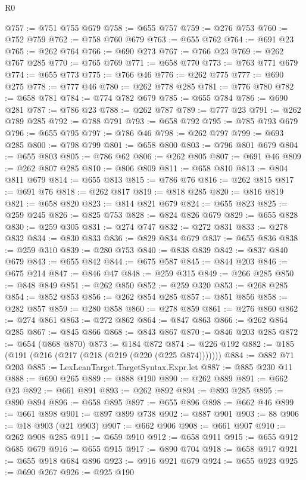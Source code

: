 \begin{lexlean}{R0}
\begin{coremodule}
@757 := @751 @755 @679
@758 := @655 @757
@759 := @276 @753
@760 := @752 @759
@762 := @758 @760 @679
@763 := @655 @762
@764 := @691 @23
@765 := @262 @764
@766 := @690 @273
@767 := @766 @23
@769 := @262 @767 @285
@770 := @765 @769
@771 := @658 @770
@773 := @763 @771 @679
@774 := @655 @773
@775 := @766 @46
@776 := @262 @775
@777 := @690 @275
@778 := @777 @46
@780 := @262 @778 @285
@781 := @776 @780
@782 := @658 @781
@784 := @774 @782 @679
@785 := @655 @784
@786 := @690 @281
@787 := @786 @23
@788 := @262 @787
@789 := @777 @23
@791 := @262 @789 @285
@792 := @788 @791
@793 := @658 @792
@795 := @785 @793 @679
@796 := @655 @795
@797 := @786 @46
@798 := @262 @797
@799 := @693 @285
@800 := @798 @799
@801 := @658 @800
@803 := @796 @801 @679
@804 := @655 @803
@805 := @786 @62
@806 := @262 @805
@807 := @691 @46
@809 := @262 @807 @285
@810 := @806 @809
@811 := @658 @810
@813 := @804 @811 @679
@814 := @655 @813
@815 := @786 @76
@816 := @262 @815
@817 := @691 @76
@818 := @262 @817
@819 := @818 @285
@820 := @816 @819
@821 := @658 @820
@823 := @814 @821 @679
@824 := @655 @823
@825 := @259 @245
@826 := @825 @753
@828 := @824 @826 @679
@829 := @655 @828
@830 := @259 @305
@831 := @274 @747
@832 := @272 @831
@833 := @278 @832
@834 := @830 @833
@836 := @829 @834 @679
@837 := @655 @836
@838 := @259 @310
@839 := @280 @753
@840 := @838 @839
@842 := @837 @840 @679
@843 := @655 @842
@844 := @675 @587
@845 := @844 @203
@846 := @675 @214
@847 := @846 @47
@848 := @259 @315
@849 := @266 @285
@850 := @848 @849
@851 := @262 @850
@852 := @259 @320
@853 := @268 @285
@854 := @852 @853
@856 := @262 @854 @285
@857 := @851 @856
@858 := @282 @857
@859 := @280 @858
@860 := @278 @859
@861 := @276 @860
@862 := @274 @861
@863 := @272 @862
@864 := @847 @863
@866 := @262 @864 @285
@867 := @845 @866
@868 := @843 @867
@870 := @846 @203 @285
@872 := @654 (@868 @870)
@873 := @184 @872
@874 := @226 @192
@882 := @185 (@191 (@216 (@217 (@218 (@219 (@220 (@225 @874)))))))
@884 := @882 @71 @203
@885 := LexLeanTarget.TargetSyntax.Expr.let
@887 := @885 @230 @11
@888 := @690 @265
@889 := @888 @190
@890 := @262 @889
@891 := @662 @23
@892 := @661 @891
@893 := @262 @892
@894 := @893 @285
@895 := @890 @894
@896 := @658 @895
@897 := @655 @896
@898 := @662 @46
@899 := @661 @898
@901 := @897 @899 @738
@902 := @887 @901
@903 := 88
@906 := @18 @903 (@21 @903)
@907 := @662 @906
@908 := @661 @907
@910 := @262 @908 @285
@911 := @659 @910
@912 := @658 @911
@915 := @655 @912 @685 @679
@916 := @655 @915
@917 := @890 @704
@918 := @658 @917
@921 := @655 @918 @684 @896
@923 := @916 @921 @679
@924 := @655 @923
@925 := @690 @267
@926 := @925 @190

\end{coremodule}
\end{lexlean}

